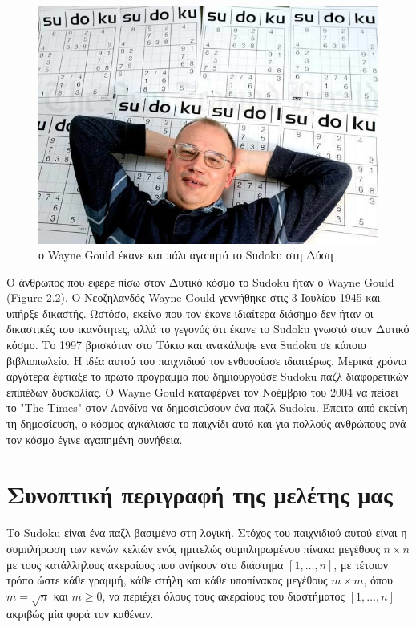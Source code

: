\documentclass[oneside,12pt]{book}
\theoremstyle{definition}
\begin{document}
\begin{figure}[h]
	\centering
	\includegraphics[scale=0.45]{Figures/WayneGould.jpg}
	\caption{ο Wayne Gould έκανε και πάλι αγαπητό το Sudoku στη Δύση}
\end{figure}

Ο άνθρωπος που έφερε πίσω στον Δυτικό κόσμο το Sudoku ήταν ο Wayne Gould (Figure 2.2). Ο Νεοζηλανδός Wayne Gould γεννήθηκε στις 3 Ιουλίου 1945 και υπήρξε δικαστής. Ωστόσο, εκείνο που τον έκανε ιδιαίτερα διάσημο δεν ήταν οι δικαστικές του ικανότητες, αλλά το γεγονός ότι έκανε το Sudoku γνωστό στον Δυτικό κόσμο. Το 1997 βρισκόταν στο Τόκιο και ανακάλυψε ενα Sudoku σε κάποιο βιβλιοπωλείο. Η ιδέα αυτού του παιχνιδιού τον ενθουσίασε ιδιαιτέρως. Μερικά χρόνια αργότερα έφτιαξε το πρωτο πρόγραμμα που δημιουργούσε Sudoku παζλ διαφορετικών επιπέδων δυσκολίας. Ο Wayne Gould καταφέρνει τον Νοέμβριο του 2004 να πείσει το "The Times" στον Λονδίνο να δημοσιεύσουν ένα παζλ Sudoku. Έπειτα από εκείνη τη δημοσίευση, ο κόσμος αγκάλιασε το παιχνίδι αυτό και για πολλούς ανθρώπους ανά τον κόσμο έγινε αγαπημένη συνήθεια. \par

\chapter{Συνοπτική περιγραφή της μελέτης μας}

Το Sudoku είναι ένα παζλ βασιμένο στη λογική. Στόχος του παιχνιδιού αυτού είναι η συμπλήρωση των
κενών κελιών ενός ημιτελώς συμπληρωμένου πίνακα μεγέθους
\(n \times n\) με τους κατάλληλους ακεραίους που ανήκουν στο διάστημα \(\left[1,\dots,n \right]\), με τέτοιον τρόπο ώστε κάθε γραμμή, κάθε στήλη και κάθε υποπίνακας μεγέθους \(m \times m\), όπου \(m = \sqrt{n} \) και \( m \ge 0\), να περιέχει όλους τους ακεραίους του διαστήματος  \(\left[1,\dots,n \right]\) ακριβώς μία φορά τον καθέναν. \par
\end{document}
